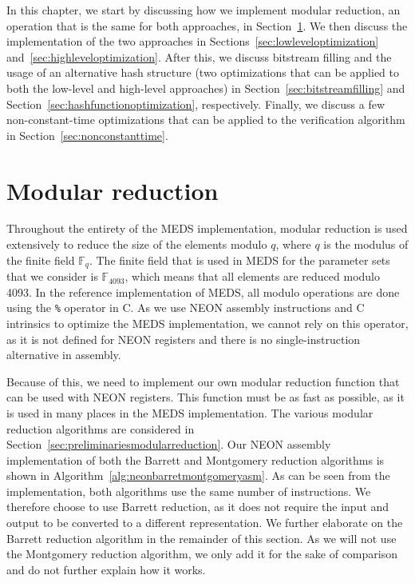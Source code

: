 \documentclass[11pt,a4paper]{report}
\theoremstyle{definition}
\begin{document}
\pagebreak

In this chapter, we start by discussing how we implement modular reduction, an operation that is the same for both approaches, in Section~\ref{sec:modularreduction}. We then discuss the implementation of the two approaches in Sections~\ref{sec:lowleveloptimization} and~\ref{sec:highleveloptimization}. After this, we discuss bitstream filling and the usage of an alternative hash structure (two optimizations that can be applied to both the low-level and high-level approaches) in Section~\ref{sec:bitstreamfilling} and Section~\ref{sec:hashfunctionoptimization}, respectively. Finally, we discuss a few non-constant-time optimizations that can be applied to the verification algorithm in Section~\ref{sec:nonconstanttime}.

\section{Modular reduction}
\label{sec:modularreduction}
Throughout the entirety of the MEDS implementation, modular reduction is used extensively to reduce the size of the elements modulo $q$, where $q$ is the modulus of the finite field $\mathbb{F}_q$. The finite field that is used in MEDS for the parameter sets that we consider is $\mathbb{F}_{4093}$, which means that all elements are reduced modulo 4093. In the reference implementation of MEDS, all modulo operations are done using the \texttt{\%} operator in C. As we use NEON assembly instructions and C intrinsics to optimize the MEDS implementation, we cannot rely on this operator, as it is not defined for NEON registers and there is no single-instruction alternative in assembly.

Because of this, we need to implement our own modular reduction function that can be used with NEON registers. This function must be as fast as possible, as it is used in many places in the MEDS implementation. The various modular reduction algorithms are considered in Section~\ref{sec:preliminariesmodularreduction}. Our NEON assembly implementation of both the Barrett and Montgomery reduction algorithms is shown in Algorithm~\ref{alg:neonbarretmontgomeryasm}. As can be seen from the implementation, both algorithms use the same number of instructions. We therefore choose to use Barrett reduction, as it does not require the input and output to be converted to a different representation. We further elaborate on the Barrett reduction algorithm in the remainder of this section. As we will not use the Montgomery reduction algorithm, we only add it for the sake of comparison and do not further explain how it works.
\end{document}
